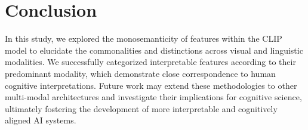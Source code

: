 \vspace{-3mm}
\section{Conclusion}
\vspace{-3mm}
In this study, we explored the monosemanticity of features within the CLIP model to elucidate the commonalities and distinctions across visual and linguistic modalities. 
We successfully categorized interpretable features according to their predominant modality, which demonstrate close correspondence to human cognitive interpretations. Future work may extend these methodologies to other multi-modal architectures and investigate their implications for cognitive science, ultimately fostering the development of more interpretable and cognitively aligned AI systems.

